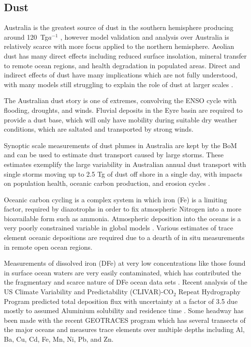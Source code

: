 \subsection{Dust}

Australia is the greatest source of dust in the southern hemisphere producing around 120~Tg$a^{-1}$ \cite{Li_2008}, however model validation and analysis over Australia is relatively scarce with more focus applied to the northern hemisphere.
Aeolian dust has many direct effects including reduced surface insolation, mineral transfer to remote ocean regions, and health degradation in populated areas.
Direct and indirect effects of dust have many implications which are not fully understood, with many models still struggling to explain the role of dust at larger scales \cite{Rotstayn_2011}.

The Australian dust story is one of extremes, convolving the ENSO cycle with flooding, droughts, and winds.
Fluvial deposits in the Eyre basin are required to provide a dust base, which will only have mobility during suitable dry weather conditions, which are saltated and transported by strong winds\cite{Zender_2003}.

Synoptic scale measurements of dust plumes in Australia are kept by the BoM and can be used to estimate dust transport caused by large storms. 
These estimates exemplify the large variability in Australian annual dust transport with single storms moving up to 2.5 Tg of dust off shore in a single day, with impacts on population health, oceanic carbon production, and erosion cycles \cite{Leys_2011,Shao_2007}.

Oceanic carbon cycling is a complex system in which iron (Fe) is a limiting factor, required by diazotrophs in order to fix atmospheric Nitrogen into a more bioavailable form such as ammonia.
Atmospheric deposition into the oceans is a very poorly constrained variable in global models \cite{Grand_2015}.
Various estimates of trace element oceanic depositions are required due to a dearth of in situ measurements in remote open ocean regions.

Measurements of dissolved iron (DFe) at very low concentrations like those found in surface ocean waters are very easily contaminated, which has contributed the the fragmentary and scarce nature of DFe ocean data sets \cite{Rijkenberg_2014}.
Recent analysis of the US Climate Variability and Predictability (CLIVAR)-CO$_{2}$ Repeat Hydrography Program predicted total deposition flux with uncertainty at a factor of 3.5 due mostly to assumed Aluminium solubility and residence time \cite{Grand_2015}.
Some headway has been made with the recent GEOTRACES program which has several transects of the major oceans and measures trace elements over multiple depths including Al, Ba, Cu, Cd, Fe, Mn, Ni, Pb, and Zn.
  
